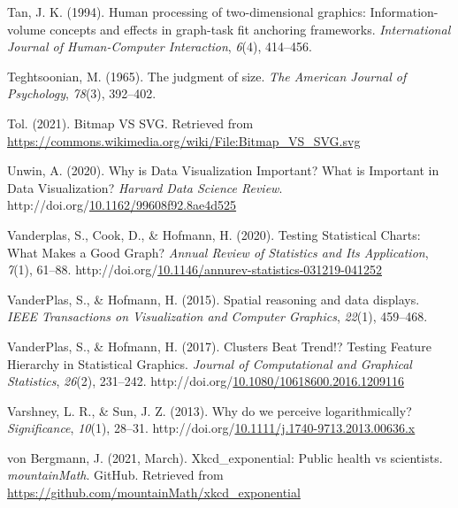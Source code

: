 \documentclass[print]{nuthesis}
\newlength{\cslhangindent}
\newenvironment{CSLReferences}%
{\setlength{\parindent}{0pt}%
\everypar{\setlength{\hangindent}{\cslhangindent}}\ignorespaces}%
{\par}
\begin{document}
\begin{CSLReferences}{1}{0}
\leavevmode{}%
Tan, J. K. (1994). Human processing of two-dimensional graphics: Information-volume concepts and effects in graph-task fit anchoring frameworks. \emph{International Journal of Human-Computer Interaction}, \emph{6}(4), 414--456.

\leavevmode{}%
Teghtsoonian, M. (1965). The judgment of size. \emph{The American Journal of Psychology}, \emph{78}(3), 392--402.

\leavevmode{}%
Tol. (2021). Bitmap VS SVG. Retrieved from \url{https://commons.wikimedia.org/wiki/File:Bitmap_VS_SVG.svg}

\leavevmode{}%
Unwin, A. (2020). Why is {Data} {Visualization} {Important}? {What} is {Important} in {Data} {Visualization}? \emph{Harvard Data Science Review}. http://doi.org/\href{https://doi.org/10.1162/99608f92.8ae4d525}{10.1162/99608f92.8ae4d525}

\leavevmode{}%
Vanderplas, S., Cook, D., \& Hofmann, H. (2020). Testing {Statistical} {Charts}: {What} {Makes} a {Good} {Graph}? \emph{Annual Review of Statistics and Its Application}, \emph{7}(1), 61--88. http://doi.org/\href{https://doi.org/10.1146/annurev-statistics-031219-041252}{10.1146/annurev-statistics-031219-041252}

\leavevmode{}%
VanderPlas, S., \& Hofmann, H. (2015). Spatial reasoning and data displays. \emph{IEEE Transactions on Visualization and Computer Graphics}, \emph{22}(1), 459--468.

\leavevmode{}%
VanderPlas, S., \& Hofmann, H. (2017). Clusters {Beat} {Trend}!? {Testing} {Feature} {Hierarchy} in {Statistical} {Graphics}. \emph{Journal of Computational and Graphical Statistics}, \emph{26}(2), 231--242. http://doi.org/\href{https://doi.org/10.1080/10618600.2016.1209116}{10.1080/10618600.2016.1209116}

\leavevmode{}%
Varshney, L. R., \& Sun, J. Z. (2013). Why do we perceive logarithmically? \emph{Significance}, \emph{10}(1), 28--31. http://doi.org/\href{https://doi.org/10.1111/j.1740-9713.2013.00636.x}{10.1111/j.1740-9713.2013.00636.x}

\leavevmode{}%
von Bergmann, J. (2021, March). Xkcd\_exponential: Public health vs scientists. \emph{mountainMath}. GitHub. Retrieved from \url{https://github.com/mountainMath/xkcd_exponential}


\end{CSLReferences}
\end{document}
